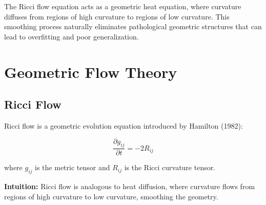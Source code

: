 \documentclass[12pt,a4paper]{article}
\begin{document}
The Ricci flow equation acts as a geometric heat equation, where curvature diffuses from regions of high curvature to regions of low curvature. This smoothing process naturally eliminates pathological geometric structures that can lead to overfitting and poor generalization.

\section{Geometric Flow Theory}

\subsection{Ricci Flow}

Ricci flow is a geometric evolution equation introduced by Hamilton (1982):

\begin{equation}
\frac{\partial g_{ij}}{\partial t} = -2R_{ij}
\end{equation}

where $g_{ij}$ is the metric tensor and $R_{ij}$ is the Ricci curvature tensor.

\textbf{Intuition:} Ricci flow is analogous to heat diffusion, where curvature flows from regions of high curvature to low curvature, smoothing the geometry.
\end{document}
